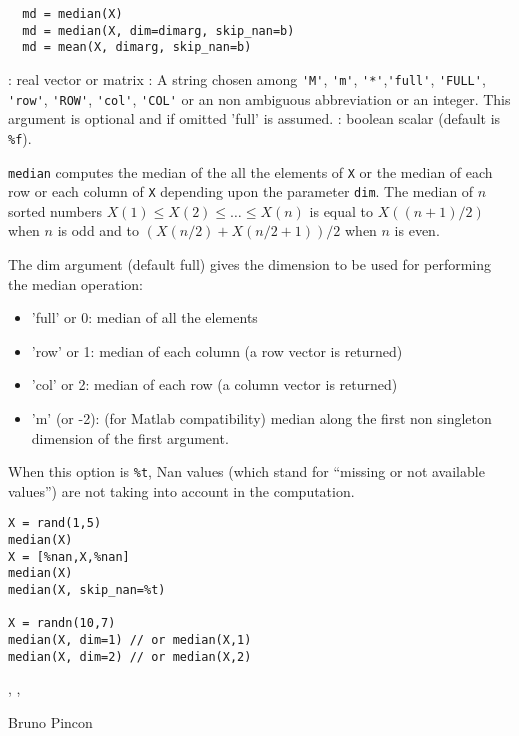 
\begin{mandesc}
\end{mandesc}

\begin{calling_sequence}
\begin{verbatim}
  md = median(X)
  md = median(X, dim=dimarg, skip_nan=b)  
  md = mean(X, dimarg, skip_nan=b)  
\end{verbatim}
\end{calling_sequence}
\begin{parameters}
  \begin{varlist}
    : real vector or matrix
    : A string chosen among \verb+'M'+, \verb+'m'+, \verb+'*'+,\verb+'full'+, \verb+'FULL'+, \verb+'row'+,
    \verb+'ROW'+, \verb+'col'+, \verb+'COL'+ or an non ambiguous abbreviation or an integer. 
    This argument is optional and if omitted 'full' is assumed.
    : boolean scalar (default is \verb+%f+).
  \end{varlist}
\end{parameters}

\begin{mandescription}
  \verb+median+ computes the median of the all the elements of \verb+X+
or the median of each row or each column of \verb+X+ depending upon
the parameter \verb+dim+. The median of $n$ sorted numbers 
$X(1) \le X(2) \le \dots \le X(n)$ is equal to $X((n+1)/2)$ when $n$
is odd and to  $(X(n/2)+X(n/2+1))/2$ when $n$ is even.

  The dim argument (default full) gives the dimension to be used for performing the median operation:
  \begin{itemize}
    \item 'full' or 0: median of all the elements 
    \item 'row' or 1: median of each column (a row vector is returned)
    \item 'col' or 2: median of each row (a column vector is returned)
    \item 'm' (or -2): (for Matlab compatibility) median along the first non 
          singleton dimension of the first argument.
  \end{itemize}

   When this option is \verb+%t+,  Nan values (which stand for ``missing or not 
 available values'') are not taking into account in the computation.
\end{mandescription}
\begin{examples}
\begin{Verbatim}
X = rand(1,5)
median(X)
X = [%nan,X,%nan]
median(X)
median(X, skip_nan=%t) 

X = randn(10,7)
median(X, dim=1) // or median(X,1)
median(X, dim=2) // or median(X,2)
\end{Verbatim}
\end{examples}

\begin{manseealso}
   , , 
\end{manseealso}

\begin{authors}
 Bruno Pincon
\end{authors}
